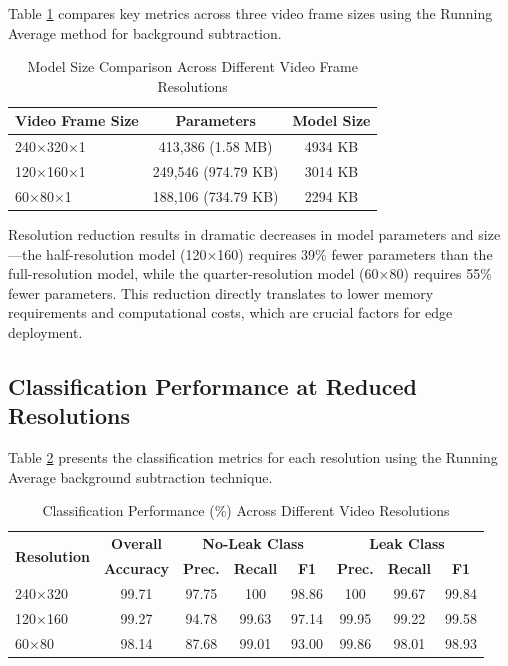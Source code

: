 Table \ref{tab:model_size_comparison} compares key metrics across three video frame sizes using the Running Average method for background subtraction.

\begin{table}[htbp]
\caption{Model Size Comparison Across Different Video Frame Resolutions}
\label{tab:model_size_comparison}
\begin{tabular}{|l|c|c|}
\hline
\textbf{Video Frame Size} & \textbf{Parameters} & \textbf{Model Size} \\
\hline
240×320×1 & 413,386 (1.58 MB) & 4934 KB \\
120×160×1 & 249,546 (974.79 KB) & 3014 KB \\
60×80×1 & 188,106 (734.79 KB) & 2294 KB \\
\hline
\end{tabular}
\end{table}

Resolution reduction results in dramatic decreases in model parameters and size—the half-resolution model (120×160) requires 39\% fewer parameters than the full-resolution model, while the quarter-resolution model (60×80) requires 55\% fewer parameters. This reduction directly translates to lower memory requirements and computational costs, which are crucial factors for edge deployment.

\subsection{Classification Performance at Reduced Resolutions}

Table \ref{tab:resolution_performance} presents the classification metrics for each resolution using the Running Average background subtraction technique.

\begin{table}[htbp]
\caption{Classification Performance (\%) Across Different Video Resolutions}
\label{tab:resolution_performance}
\setlength{\tabcolsep}{5pt}
\centering
\begin{tabular}{|l|c|c|c|c|c|c|c|}
\hline
\multirow{2}{*}{\textbf{Resolution}} & \textbf{Overall} & \multicolumn{3}{c|}{\textbf{No-Leak Class}} & \multicolumn{3}{c|}{\textbf{Leak Class}} \\
\cline{3-8}
 & \textbf{Accuracy} & \textbf{Prec.} & \textbf{Recall} & \textbf{F1} & \textbf{Prec.} & \textbf{Recall} & \textbf{F1} \\
\hline
240×320 & 99.71 & 97.75 & 100 & 98.86 & 100 & 99.67 & 99.84 \\
\hline
120×160 & 99.27 & 94.78 & 99.63 & 97.14 & 99.95 & 99.22 & 99.58 \\
\hline
60×80 & 98.14 & 87.68 & 99.01 & 93.00 & 99.86 & 98.01 & 98.93 \\
\hline
\end{tabular}
\end{table}


